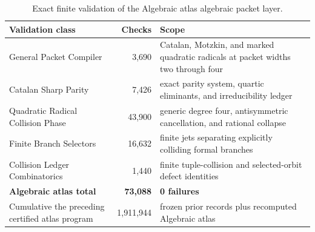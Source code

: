 \begin{table}[H]
\centering
\small
\caption{Exact finite validation of the Algebraic atlas algebraic packet layer.}
\label{tab:block10-validation}
\begin{tabularx}{\textwidth}{@{}L{0.34\textwidth}rY@{}}
\toprule
Validation class & Checks & Scope\\
\midrule
General Packet Compiler & 3,690 & Catalan, Motzkin, and marked quadratic radicals at packet widths two through four\\
Catalan Sharp Parity & 7,426 & exact parity system, quartic eliminants, and irreducibility ledger\\
Quadratic Radical Collision Phase & 43,900 & generic degree four, antisymmetric cancellation, and rational collapse\\
Finite Branch Selectors & 16,632 & finite jets separating explicitly colliding formal branches\\
Collision Ledger Combinatorics & 1,440 & finite tuple-collision and selected-orbit defect identities\\
\midrule
\textbf{Algebraic atlas total} & \textbf{73,088} & \textbf{0 failures}\\
Cumulative the preceding certified atlas program & 1,911,944 & frozen prior records plus recomputed Algebraic atlas\\
\bottomrule
\end{tabularx}
\end{table}
